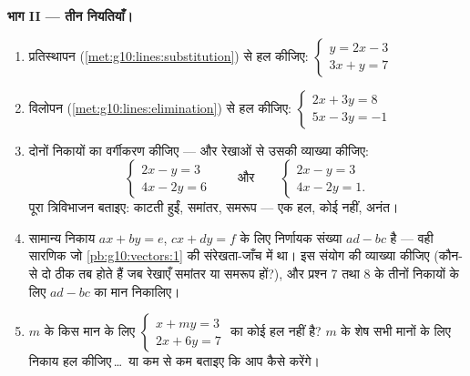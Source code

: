 \begin{problem}
\medskip
\noindent\textbf{भाग II --- तीन नियतियाँ।}
\begin{enumerate}[resume]
  \item प्रतिस्थापन (\cref{met:g10:lines:substitution}) से हल कीजिए:
        $\begin{cases} y = 2x - 3 \\ 3x + y = 7 \end{cases}$
  \item विलोपन (\cref{met:g10:lines:elimination}) से हल कीजिए:
        $\begin{cases} 2x + 3y = 8 \\ 5x - 3y = -1 \end{cases}$
  \item दोनों निकायों का वर्गीकरण कीजिए --- और रेखाओं से उसकी व्याख्या
        कीजिए:
        \[
        \begin{cases} 2x - y = 3 \\ 4x - 2y = 6 \end{cases}
        \qquad\text{और}\qquad
        \begin{cases} 2x - y = 3 \\ 4x - 2y = 1 . \end{cases}
        \]
        पूरा त्रिविभाजन बताइए: काटती हुईं, समांतर, समरूप --- एक हल, कोई
        नहीं, अनंत।
  \item सामान्य निकाय $ax + by = e$, $cx + dy = f$ के लिए निर्णायक संख्या $ad - bc$ है --- वही
        सारणिक जो \cref{pb:g10:vectors:1} की संरेखता-जाँच में था। इस संयोग की व्याख्या कीजिए
        (कौन-से दो  ठीक तब  होते हैं जब रेखाएँ समांतर या समरूप
        हों?), और प्रश्न 7 तथा 8 के तीनों निकायों के लिए $ad - bc$ का मान
        निकालिए।
  \item $m$ के किस मान के लिए
        $\begin{cases} x + my = 3 \\ 2x + 6y = 7 \end{cases}$
        का कोई हल नहीं है? $m$ के शेष सभी मानों के लिए निकाय हल
        कीजिए\,\dots\ या कम से कम बताइए कि आप कैसे करेंगे।
\end{enumerate}


\end{problem}
